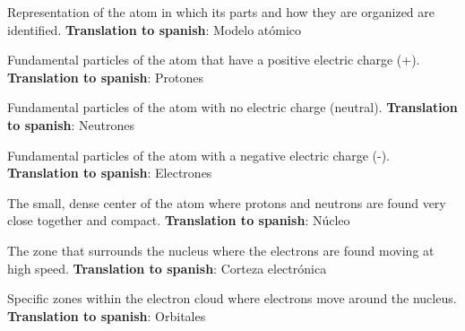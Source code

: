 \begin{vocabulary}
      Representation of the atom in which its parts and how they are organized are identified. \newline
       \textbf{Translation to spanish}: Modelo atómico \newline
\end{vocabulary}

\begin{vocabulary}[Protons]
      Fundamental particles of the atom that have a positive electric charge (+). \newline
       \textbf{Translation to spanish}: Protones \newline
\end{vocabulary}

\begin{vocabulary}[Neutrons]
      Fundamental particles of the atom with no electric charge (neutral). \newline
       \textbf{Translation to spanish}: Neutrones \newline
\end{vocabulary}

\begin{vocabulary}[Electrons]
      Fundamental particles of the atom with a negative electric charge (-). \newline
       \textbf{Translation to spanish}: Electrones \newline
\end{vocabulary}

\begin{vocabulary}[Nucleus]
      The small, dense center of the atom where protons and neutrons are found very close together and compact. \newline
       \textbf{Translation to spanish}: Núcleo \newline
\end{vocabulary}

\begin{vocabulary}
      The zone that surrounds the nucleus where the electrons are found moving at high speed. \newline
       \textbf{Translation to spanish}: Corteza electrónica \newline
\end{vocabulary}

\begin{vocabulary}[Orbitals]
      Specific zones within the electron cloud where electrons move around the nucleus. \newline
       \textbf{Translation to spanish}: Orbitales \newline
\end{vocabulary}

